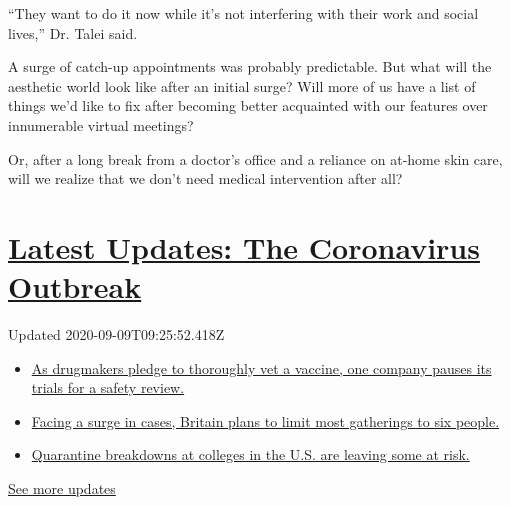 ``They want to do it now while it's not interfering with their work and
social lives,'' Dr. Talei said.

A surge of catch-up appointments was probably predictable. But what will
the aesthetic world look like after an initial surge? Will more of us
have a list of things we'd like to fix after becoming better acquainted
with our features over innumerable virtual meetings?

Or, after a long break from a doctor's office and a reliance on at-home
skin care, will we realize that we don't need medical intervention after
all?

\hypertarget{latest-updates-the-coronavirus-outbreak}{%
\section{\texorpdfstring{\href{https://www.nytimes3xbfgragh.onion/2020/09/09/world/covid-19-coronavirus.html?action=click\&pgtype=Article\&state=default\&region=MAIN_CONTENT_1\&context=storylines_live_updates}{Latest
Updates: The Coronavirus
Outbreak}}{Latest Updates: The Coronavirus Outbreak}}\label{latest-updates-the-coronavirus-outbreak}}

Updated 2020-09-09T09:25:52.418Z

\begin{itemize}
\tightlist
\item
  \href{https://www.nytimes3xbfgragh.onion/2020/09/09/world/covid-19-coronavirus.html?action=click\&pgtype=Article\&state=default\&region=MAIN_CONTENT_1\&context=storylines_live_updates\#link-70cea8bb}{As
  drugmakers pledge to thoroughly vet a vaccine, one company pauses its
  trials for a safety review.}
\item
  \href{https://www.nytimes3xbfgragh.onion/2020/09/09/world/covid-19-coronavirus.html?action=click\&pgtype=Article\&state=default\&region=MAIN_CONTENT_1\&context=storylines_live_updates\#link-4438dd7}{Facing
  a surge in cases, Britain plans to limit most gatherings to six
  people.}
\item
  \href{https://www.nytimes3xbfgragh.onion/2020/09/09/world/covid-19-coronavirus.html?action=click\&pgtype=Article\&state=default\&region=MAIN_CONTENT_1\&context=storylines_live_updates\#link-11cec4c0}{Quarantine
  breakdowns at colleges in the U.S. are leaving some at risk.}
\end{itemize}

\href{https://www.nytimes3xbfgragh.onion/2020/09/09/world/covid-19-coronavirus.html?action=click\&pgtype=Article\&state=default\&region=MAIN_CONTENT_1\&context=storylines_live_updates}{See
more updates}

